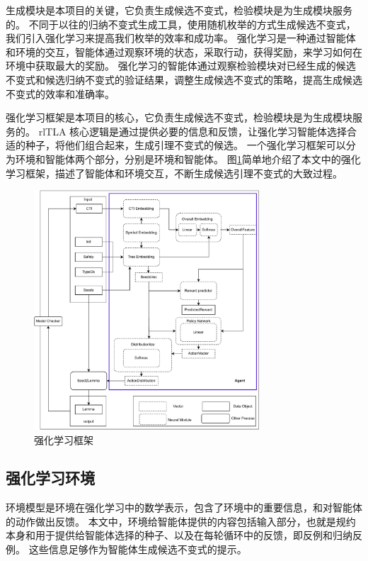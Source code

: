 生成模块是本项目的关键，它负责生成候选不变式，检验模块是为生成模块服务的。
不同于以往的归纳不变式生成工具，使用随机枚举的方式生成候选不变式，我们引入强化学习来提高我们枚举的效率和成功率。
强化学习是一种通过智能体和环境的交互，智能体通过观察环境的状态，采取行动，获得奖励，来学习如何在环境中获取最大的奖励。
强化学习的智能体通过观察检验模块对已经生成的候选不变式和候选归纳不变式的验证结果，调整生成候选不变式的策略，提高生成候选不变式的效率和准确率。

强化学习框架是本项目的核心，它负责生成候选不变式，检验模块是为生成模块服务的。
rlTLA 核心逻辑是通过提供必要的信息和反馈，让强化学习智能体选择合适的种子，将他们组合起来，生成引理不变式的候选。
一个强化学习框架可以分为环境和智能体两个部分，分别是环境和智能体。
图\ref{fig:agent_env}简单地介绍了本文中的强化学习框架，描述了智能体和环境交互，不断生成候选引理不变式的大致过程。
\begin{figure}[h]
	\centering
	\includegraphics[width=0.75\textwidth]{figures/agent_env.pdf}
	\caption{强化学习框架}
	\label{fig:agent_env}
\end{figure}

\subsection{强化学习环境}

环境模型是环境在强化学习中的数学表示，包含了环境中的重要信息，和对智能体的动作做出反馈。
本文中，环境给智能体提供的内容包括输入部分，也就是\TLA 规约本身和用于提供给智能体选择的种子、以及在每轮循环中的反馈，即反例和归纳反例。
这些信息足够作为智能体生成候选不变式的提示。

